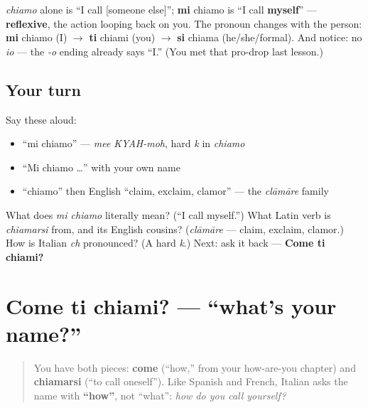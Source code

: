 \begin{grammarlens}[title={Grammar Lens: the reflexive, and the dropping of \emph{io}}]
\emph{chiamo} alone is \textquotedblleft{}I call {[}someone else{]}\textquotedblright{}; \textbf{mi} chiamo is \textquotedblleft{}I call \textbf{myself}\textquotedblright{} — \textbf{reflexive}, the action looping back on you. The pronoun changes with the person: \textbf{mi} chiamo (I) $\to$ \textbf{ti} chiami (you) $\to$ \textbf{si} chiama (he/she/formal). And notice: no \emph{io} — the \emph{-o} ending already says \textquotedblleft{}I.\textquotedblright{} (You met that pro-drop last lesson.)
\end{grammarlens}

\subsection*{Your turn}
Say these aloud:

\begin{itemize}
\raggedright
  \item \textquotedblleft{}mi chiamo\textquotedblright{} — \emph{mee KYAH-moh}, hard \emph{k} in \emph{chiamo}
  \item \textquotedblleft{}Mi chiamo …\textquotedblright{} with your own name
  \item \textquotedblleft{}chiamo\textquotedblright{} then English \textquotedblleft{}claim, exclaim, clamor\textquotedblright{} — the \emph{clāmāre} family
\end{itemize}

\begin{tcolorbox}[breakable,colback=teal!4,colframe=teal!35!black,title={Before you move on}]
What does \emph{mi chiamo} literally mean? (\textquotedblleft{}I call myself.\textquotedblright{}) What Latin verb is \emph{chiamarsi} from, and its English cousins? (\emph{clāmāre} — claim, exclaim, clamor.) How is Italian \emph{ch} pronounced? (A hard \emph{k}.) Next: ask it back — \textbf{Come ti chiami?}
\end{tcolorbox}
\section[Come ti chiami?]{Come ti chiami? — \textquotedblleft{}what's your name?\textquotedblright{}}

\label{lesson:IT-C03-come-ti-chiami}



\begin{quote}
You have both pieces: \textbf{come} (\textquotedblleft{}how,\textquotedblright{} from your how-are-you chapter) and \textbf{chiamarsi} (\textquotedblleft{}to call oneself\textquotedblright{}). Like Spanish and French, Italian asks the name with \textbf{\textquotedblleft{}how\textquotedblright{}}, not \textquotedblleft{}what\textquotedblright{}: \emph{how do you call yourself?}
\end{quote}

